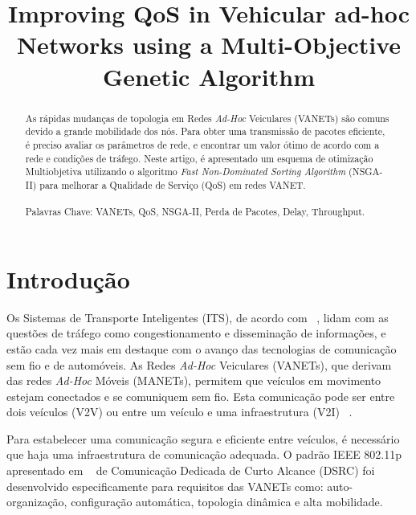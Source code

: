 \documentclass[conference]{IEEEtran}
\begin{document}
\title{Improving QoS in Vehicular ad-hoc Networks using a Multi-Objective Genetic Algorithm}

\author{
\and
{}
}

\maketitle

\begin{abstract}
As rápidas mudanças de topologia em Redes \textit{Ad-Hoc} Veiculares (VANETs) são comuns devido a grande mobilidade dos nós. Para obter uma transmissão de pacotes eficiente, é preciso avaliar os parâmetros de rede, e encontrar um valor ótimo de acordo com a rede e condições de tráfego. Neste artigo, é apresentado um esquema de otimização Multiobjetiva utilizando o algoritmo \textit{Fast Non-Dominated Sorting Algorithm} (NSGA-II) para melhorar a Qualidade de Serviço (QoS) em redes VANET.
\\
\\
Palavras Chave: VANETs, QoS, NSGA-II, Perda de Pacotes, Delay, Throughput.
\end{abstract}

\section{Introdução}

Os Sistemas de Transporte Inteligentes (ITS), de acordo com ~\cite{Vanajakshi:2010}, lidam com as questões de tráfego como congestionamento e disseminação de informações, e estão cada vez mais em destaque com o avanço das tecnologias de comunicação sem fio e de automóveis. As Redes \textit{Ad-Hoc} Veiculares (VANETs), que derivam das redes \textit{Ad-Hoc} Móveis (MANETs), permitem que veículos em movimento estejam conectados e se comuniquem sem fio. Esta comunicação pode ser entre dois veículos (V2V) ou entre um veículo e uma infraestrutura (V2I) ~\cite{Anwer:2016}.

Para estabelecer uma comunicação segura e eficiente entre veículos, é necessário que haja uma infraestrutura de comunicação adequada. O padrão IEEE 802.11p apresentado em ~\cite{Jiang:2008} de Comunicação Dedicada de Curto Alcance (DSRC) foi desenvolvido especificamente para requisitos das VANETs como: auto-organização, configuração automática, topologia dinâmica e alta mobilidade.
\end{document}
